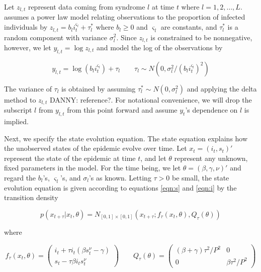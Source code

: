 \documentclass{article}
\newcommand{\danny}[1]{{\color{blue}DANNY: #1}}
\begin{document}
Let $z_{l,t}$ represent data coming from syndrome $l$ at time $t$ where $l = 1,2,\ldots,L$.  \citet{skvortsov2012monitoring} assumes a power law model relating observations to the proportion of infected individuals by $z_{l,t} = b_li_t^{\varsigma_l} + \tau^*_l$ where $b_l \ge 0$ and $\varsigma_l$ are constants, and $\tau^*_l$ is a random component with variance $\sigma_l^2$. Since $z_{l,t}$ is constrained to be nonnegative, however, we let $y_{l,t} = \log z_{l,t}$ and model the log of the observations by

\begin{equation}
y_{l,t} = \log \left(b_li_t^{\varsigma_l}\right) + \tau_l \qquad \tau_l \sim N\left(0,\sigma_l^2 / (b_li_t^{\varsigma_l})^2\right) \label{eqn:obs}
\end{equation}

\noindent The variance of $\tau_l$ is obtained by assuming $\tau^*_l \sim N(0,\sigma_l^2)$ and applying the delta method to $z_{l,t}$ \danny{reference?}.  For notational convenience, we will drop the subscript $l$ from $y_{l,t}$ from this point forward and assume $y_t$'s dependence on $l$ is implied.

Next, we specify the state evolution equation.  The state equation explains how the unobserved states of the epidemic evolve over time.  Let $x_t = (i_t,s_t)'$ represent the state of the epidemic at time $t$, and let $\theta$ represent any unknown, fixed parameters in the model.  For the time being, we let $\theta = (\beta, \gamma, \nu)'$ and regard the $b_l$'s, $\varsigma_l$'s, and $\sigma_l$'s as known.  Letting $\tau > 0$ be small, the state evolution equation is given according to equations \eqref{eqn:s} and \eqref{eqn:i} by the transition density

\begin{equation}
p\left(x_{t+\tau}\left|x_t,\theta\right.\right) = N_{[0,1]\times[0,1]}\left(x_{t+\tau};f_\tau(x_t,\theta),Q_{\tau}(\theta)\right) \label{eqn:state}
\end{equation}

\noindent where

\[
f_\tau(x_t,\theta) = \left(
\begin{array}{c}
i_t + \tau i_t(\beta s^{\nu}_t - \gamma) \\
s_t - \tau\beta i_ts^{\nu}_t
\end{array}
\right)
\qquad
Q_\tau(\theta) = \left(
\begin{array}{ccccc}
(\beta + \gamma)\tau^2/P^2 & 0 \\
0 & \beta\tau^2/P^2
\end{array}
\right)
\]
\end{document}
